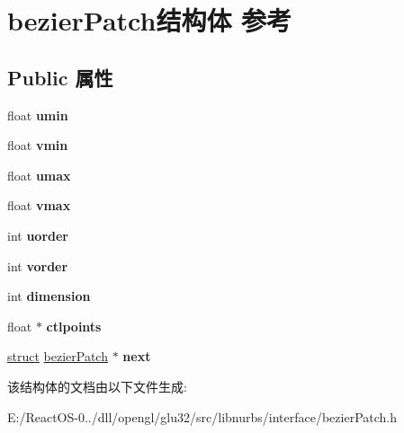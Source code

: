 \hypertarget{structbezier_patch}{}\section{bezier\+Patch结构体 参考}
\label{structbezier_patch}
\subsection*{Public 属性}
\begin{DoxyCompactItemize}
\item 
\mbox{\label{structbezier_patch_a50dd3aca4b9106947cf6a6a4a87447e6}} 
float {\bfseries umin}
\item 
\mbox{\label{structbezier_patch_acbf870cf4e08dfc708d17e1ba1ba1755}} 
float {\bfseries vmin}
\item 
\mbox{\label{structbezier_patch_ae3873b3b1c2520b36a03286242d525d6}} 
float {\bfseries umax}
\item 
\mbox{\label{structbezier_patch_a083195aa270a461c39e03212fabb8870}} 
float {\bfseries vmax}
\item 
\mbox{\label{structbezier_patch_af5dbbf32801f768d1cb7056fb2b3c152}} 
int {\bfseries uorder}
\item 
\mbox{\label{structbezier_patch_ac141abc60e8bc21fe00bbbdb79d6b7a6}} 
int {\bfseries vorder}
\item 
\mbox{\label{structbezier_patch_a67a75a03d89b4e3cdac8b50c45b730bc}} 
int {\bfseries dimension}
\item 
\mbox{\label{structbezier_patch_ae10a7a100aec4ebfb5d79566c170e165}} 
float $\ast$ {\bfseries ctlpoints}
\item 
\mbox{\label{structbezier_patch_a50b8fedbc4077c9392d07b7afbbbd451}} 
\hyperlink{interfacestruct}{struct} \hyperlink{structbezier_patch}{bezier\+Patch} $\ast$ {\bfseries next}
\end{DoxyCompactItemize}


该结构体的文档由以下文件生成\+:\begin{DoxyCompactItemize}
\item 
E\+:/\+React\+O\+S-\/0../dll/opengl/glu32/src/libnurbs/interface/bezier\+Patch.\+h\end{DoxyCompactItemize}

